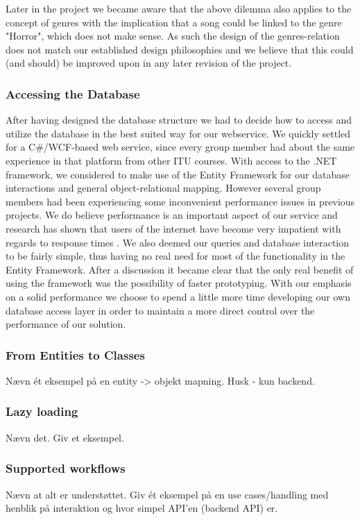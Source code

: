 Later in the project we became aware that the above dilemma also applies to the concept of genres with the implication that a song could be linked to the genre "Horror", which does not make sense. As such the design of the genres-relation does not match our established design philosophies and we believe that this could (and should) be improved upon in any later revision of the project.

\subsubsection{Accessing the Database}
\label{sec:databaseaccess}
After having designed the database structure we had to decide how to access and utilize the database in the best suited way for our webservice. We quickly settled for a C\#/WCF-based web service, since every group member had about the same experience in that platform from other ITU courses.
With access to the .NET framework, we considered to make use of the Entity Framework for our database interactions and general object-relational mapping. However several group members had been experiencing some inconvenient performance issues in previous projects. We do believe performance is an important aspect of our service and research has shown that users of the internet have become very impatient with regards to response times \cite{webusersflee}. We also deemed our queries and database interaction to be fairly simple, thus having no real need for most of the functionality in the Entity Framework. After a discussion it became clear that the only real benefit of using the framework was the possibility of faster prototyping. With our emphasis on a solid performance we choose to spend a little more time developing our own database access layer in order to maintain a more direct control over the performance of our solution.


\subsubsection{From Entities to Classes}
Nævn ét eksempel på en entity -> objekt mapning. Husk - kun backend.


\subsubsection{Lazy loading}
Nævn det.
Giv et eksempel.

\subsubsection{Supported workflows}
Nævn at alt er understøttet.
Giv ét eksempel på en use cases/handling med henblik på interaktion og hvor simpel API'en (backend API) er.